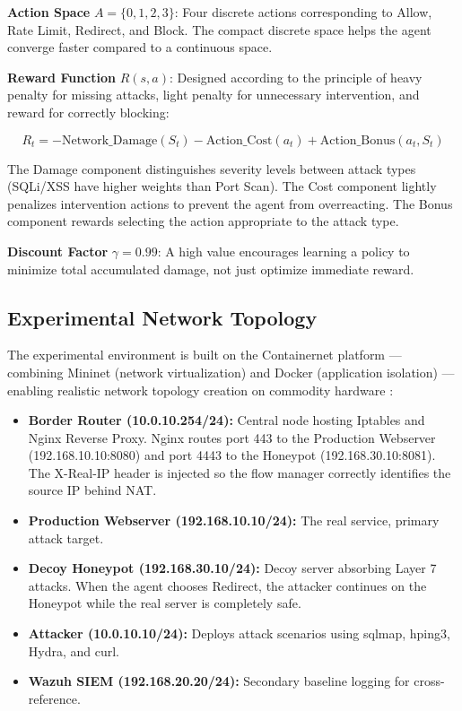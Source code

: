 \documentclass[12pt,a4paper]{report}
\begin{document}
\textbf{Action Space} $A = \{0, 1, 2, 3\}$: Four discrete actions corresponding to Allow, Rate Limit, Redirect, and Block. The compact discrete space helps the agent converge faster compared to a continuous space.

\textbf{Reward Function} $R(s, a)$: Designed according to the principle of heavy penalty for missing attacks, light penalty for unnecessary intervention, and reward for correctly blocking:

\begin{equation}
R_t = -\text{Network\_Damage}(S_t) - \text{Action\_Cost}(a_t) + \text{Action\_Bonus}(a_t, S_t)
\end{equation}

The Damage component distinguishes severity levels between attack types (SQLi/XSS have higher weights than Port Scan). The Cost component lightly penalizes intervention actions to prevent the agent from overreacting. The Bonus component rewards selecting the action appropriate to the attack type.

\textbf{Discount Factor} $\gamma = 0.99$: A high value encourages learning a policy to minimize total accumulated damage, not just optimize immediate reward.

\subsection{Experimental Network Topology}

The experimental environment is built on the Containernet platform --- combining Mininet (network virtualization) and Docker (application isolation) --- enabling realistic network topology creation on commodity hardware \cite{lantzMininet2010}:

\begin{itemize}
  \item \textbf{Border Router (10.0.10.254/24):} Central node hosting Iptables and Nginx Reverse Proxy. Nginx routes port 443 to the Production Webserver (192.168.10.10:8080) and port 4443 to the Honeypot (192.168.30.10:8081). The X-Real-IP header is injected so the flow manager correctly identifies the source IP behind NAT.
  \item \textbf{Production Webserver (192.168.10.10/24):} The real service, primary attack target.
  \item \textbf{Decoy Honeypot (192.168.30.10/24):} Decoy server absorbing Layer 7 attacks. When the agent chooses Redirect, the attacker continues on the Honeypot while the real server is completely safe.
  \item \textbf{Attacker (10.0.10.10/24):} Deploys attack scenarios using sqlmap, hping3, Hydra, and curl.
  \item \textbf{Wazuh SIEM (192.168.20.20/24):} Secondary baseline logging for cross-reference.
\end{itemize}
\end{document}
